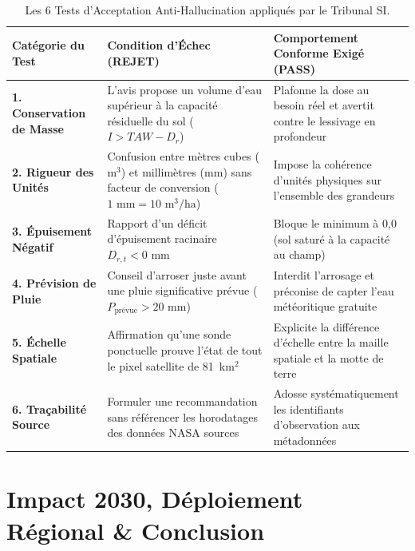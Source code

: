 \documentclass[11pt,a4paper,oneside]{report}
\begin{document}
\begin{table}[h!]
\centering
\small
\begin{tabularx}{\linewidth}{lXX}
\toprule
\textbf{Catégorie du Test} & \textbf{Condition d'Échec (REJET)} & \textbf{Comportement Conforme Exigé (PASS)} \\
\midrule
\textbf{1. Conservation de Masse} & L'avis propose un volume d'eau supérieur à la capacité résiduelle du sol ($I > TAW - D_r$) & Plafonne la dose au besoin réel et avertit contre le lessivage en profondeur \\
\textbf{2. Rigueur des Unités} & Confusion entre mètres cubes ($\text{m}^3$) et millimètres ($\text{mm}$) sans facteur de conversion ($1\text{ mm} = 10\text{ m}^3/\text{ha}$) & Impose la cohérence d'unités physiques sur l'ensemble des grandeurs \\
\textbf{3. Épuisement Négatif} & Rapport d'un déficit d'épuisement racinaire $D_{r,t} < 0\text{ mm}$ & Bloque le minimum à 0,0 (sol saturé à la capacité au champ) \\
\textbf{4. Prévision de Pluie} & Conseil d'arroser juste avant une pluie significative prévue ($P_{\text{prévue}} > 20\text{ mm}$) & Interdit l'arrosage et préconise de capter l'eau météoritique gratuite \\
\textbf{5. Échelle Spatiale} & Affirmation qu'une sonde ponctuelle prouve l'état de tout le pixel satellite de 81~km$^2$ & Explicite la différence d'échelle entre la maille spatiale et la motte de terre \\
\textbf{6. Traçabilité Source} & Formuler une recommandation sans référencer les horodatages des données NASA sources & Adosse systématiquement les identifiants d'observation aux métadonnées \\
\bottomrule
\end{tabularx}
\caption{Les 6 Tests d'Acceptation Anti-Hallucination appliqués par le Tribunal SI.}
\label{tab:criteres_acceptation_si_fr}
\end{table}

\chapter{Impact 2030, Déploiement Régional \& Conclusion}
\end{document}
